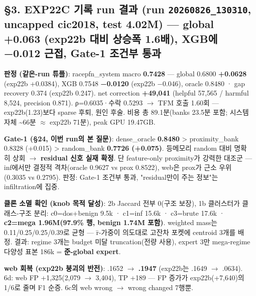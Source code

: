\subsection{§3. EXP22C 기록 run 결과 (run \texttt{20260826\allowbreak{}\_\allowbreak{}\allowbreak{}130310}, uncapped cic2018, test 4.02M) — \textbf{global +\allowbreak{}0.063 (exp22b 대비 상승폭 1.6배), XGB에 −0.012 근접, Gate-1 조건부 통과}}
\textbf{판정 (같은-run 튜플)}: racepfn\_\allowbreak{}system macro \textbf{0.7428} — global 0.6800 \textbf{+\allowbreak{}0.0628} (exp22b +\allowbreak{}0.0384), XGB 0.7548 \textbf{−0.0120} (exp22b −0.046), oracle 0.8480 · gap recovery 0.374 (exp22b 0.247). net correction \textbf{+\allowbreak{}49,041} (helpful 57,565 /\allowbreak{} harmful 8,524, precision 0.871). ρ=\allowbreak{}0.6035·수락 0.5293  \ensuremath{\rightarrow}  TFM 호출 1.60회 — exp22b(1.23)보다 sparse 후퇴, 원인 후술. 비용 총 89.1분(banks 23.5분 포함; 시스템 자체 \textasciitilde{}66분 \ensuremath{\approx} exp22b 71분), peak GPU 19.47GB.

\textbf{Gate-1 (§24, 이번 run의 본 질문)}: dense\_\allowbreak{}oracle \textbf{0.8480} > proximity\_\allowbreak{}bank 0.8328 (+\allowbreak{}0.015) > random\_\allowbreak{}bank \textbf{0.7726 (+\allowbreak{}0.075)}. 등메모리 random 대비 명확히 상회  \ensuremath{\rightarrow}  \textbf{residual 신호 실재 확정}. 단 feature-only proximity가 강력한 대조군 — inf에서만 결정적 격차(oracle 0.9627 vs prox 0.8522), web은 prox가 근소 우위(0.3035 vs 0.2795). 판정: Gate-1 조건부 통과, "residual만이 주는 정보"는 infiltration에 집중.

\textbf{클론 소멸 확인 (knob 목적 달성)}: 2b Jaccard 전부 0(구조 보장), 1b 클러스터가 클래스-구조 분리: c0=\allowbreak{}dos+\allowbreak{}benign 9.5k · c1=\allowbreak{}inf 15.6k · c3=\allowbreak{}brute 17.6k · \textbf{c2=\allowbreak{}mega 1.96M(97.9\% 행, benign 1.74M 포함)}. weighted mass는 0.11/\allowbreak{}0.25/\allowbreak{}0.25/\allowbreak{}0.39로 균형 — r̄-가중이 의도대로 고잔차 포켓에 centroid 3개를 배정. 결과: regime 3개는 budget 미달 truncation(전량 사용), expert 3만 mega-regime 다양성 표본 186k =\allowbreak{} \textbf{준-global expert}.

\textbf{web 회복 (exp22b 붕괴의 반전)}: .1652 \ensuremath{\rightarrow} \textbf{.1947} (exp22b는 .1649 \ensuremath{\rightarrow} .0634). 6d: web FP +\allowbreak{}1,325(2,079 \ensuremath{\rightarrow} 3,404), TP +\allowbreak{}189 — FP 증가가 exp22b(+\allowbreak{}7,640)의 1/\allowbreak{}6로 줄며 F1 순증. 6c의 web wrong \ensuremath{\rightarrow} wrong changed 7행뿐.

